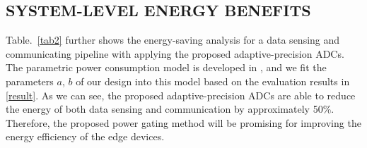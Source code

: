 \subsection{SYSTEM-LEVEL ENERGY BENEFITS}\label{system}

Table.~\ref{tab2} further shows the energy-saving analysis for a data sensing and communicating pipeline with applying the proposed adaptive-precision ADCs. The parametric power consumption model is developed in \cite{lubana_digital_2018}, and we fit the parameters $a$, $b$ of our design into this model based on the evaluation results in \ref{result}. As we can see, the proposed adaptive-precision ADCs are able to reduce the energy of both data sensing and communication by approximately 50\%. Therefore, the proposed power gating method will be promising for improving the energy efficiency of the edge devices.

